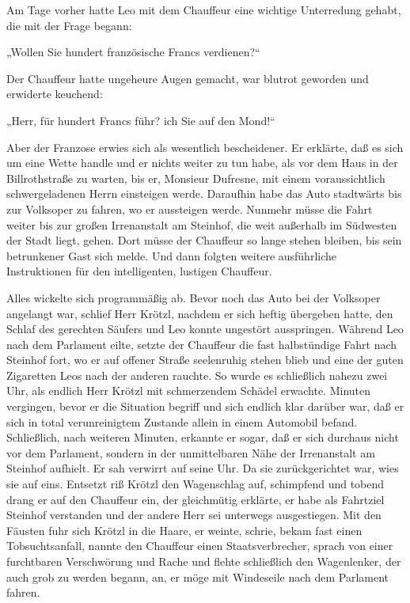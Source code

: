 Am Tage vorher hatte Leo mit dem Chauffeur eine wichtige
Unterredung gehabt, die mit der Frage begann:

„Wollen Sie hundert französische Francs verdienen?“

Der Chauffeur hatte ungeheure Augen gemacht, war blutrot geworden
und erwiderte keuchend:

„Herr, für hundert Francs führ? ich Sie auf den Mond!“

Aber der Franzose erwies sich als wesentlich bescheidener. Er
erklärte, daß es sich um eine Wette handle und er nichts weiter zu
tun habe, als vor dem Haus in der Billrothstraße zu warten, bis er,
Monsieur Dufresne, mit einem voraussichtlich schwergeladenen Herrn
einsteigen werde. Daraufhin habe das Auto stadtwärts bis zur
Volksoper zu fahren, wo er aussteigen werde. Nunmehr müsse die
Fahrt weiter bis zur großen Irrenanstalt am Steinhof, die weit
außerhalb im Südwesten der Stadt liegt, gehen. Dort müsse der
Chauffeur so lange stehen bleiben, bis sein betrunkener Gast sich
melde. Und dann folgten weitere ausführliche Instruktionen für den
intelligenten, lustigen Chauffeur.

Alles wickelte sich programmäßig ab. Bevor noch das Auto bei der
Volksoper angelangt war, schlief Herr Krötzl, nachdem er sich
heftig übergeben hatte, den Schlaf des gerechten Säufers und Leo
konnte ungestört ausspringen.  Während Leo nach dem
Parlament eilte, setzte der Chauffeur die fast halbstündige Fahrt
nach Steinhof fort, wo er auf offener Straße seelenruhig stehen
blieb und eine der guten Zigaretten Leos nach der anderen rauchte.
So wurde es schließlich nahezu zwei Uhr, als endlich Herr Krötzl
mit schmerzendem Schädel erwachte. Minuten vergingen, bevor er die
Situation begriff und sich endlich klar darüber war, daß er sich in
total verunreinigtem Zustande allein in einem Automobil befand.
Schließlich, nach weiteren Minuten, erkannte er sogar, daß er sich
durchaus nicht vor dem Parlament, sondern in der unmittelbaren Nähe
der Irrenanstalt am Steinhof aufhielt. Er sah verwirrt auf seine
Uhr. Da sie zurückgerichtet war, wies sie auf eins. Entsetzt riß
Krötzl den Wagenschlag auf, schimpfend und tobend drang er auf den
Chauffeur ein, der gleichmütig erklärte, er habe als Fahrtziel
Steinhof verstanden und der andere Herr sei unterwegs ausgestiegen.
Mit den Fäusten fuhr sich Krötzl in die Haare, er weinte, schrie,
bekam fast einen Tobsuchtsanfall, nannte den Chauffeur einen
Staatsverbrecher, sprach von einer furchtbaren Verschwörung und
Rache und flehte schließlich den Wagenlenker, der auch grob zu
werden begann, an, er möge mit Windeseile nach dem Parlament
fahren.

